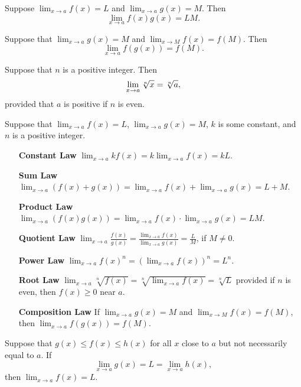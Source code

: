 \documentclass{ximera}
\begin{document}
\begin{theorem}
Suppose $\lim_{x\to a} f(x)=L$ and $\lim_{x\to a}g(x)=M$. Then
\[
\lim_{x\to a} f(x)g(x) = LM.
\]
\end{theorem}




\begin{theorem}
Suppose that $\lim_{x\to a}g(x)=M$ and $\lim_{x\to M}f(x) =
f(M)$. Then
\[
\lim_{x\to a} f(g(x)) = f(M).
\]
\end{theorem}




\begin{theorem}
Suppose that $n$ is a positive integer. Then
$$\lim_{x\to a}\root n\of{x} = \root n\of{a},$$ provided that $a$ is
positive if $n$ is even.
\end{theorem}




\begin{theorem}
Suppose that $\lim_{x\to a}f(x)=L$, $\lim_{x\to a}g(x)=M$, $k$
is some constant, and $n$ is a positive integer.
\begin{itemize}
\item[\textbf{Constant Law}] $\lim_{x\to a} kf(x) = k\lim_{x\to a}f(x)=kL$.
\item[\textbf{Sum Law}] $\lim_{x\to a} (f(x)+g(x)) = \lim_{x\to a}f(x)+\lim_{x\to a}g(x)=L+M$.
\item[\textbf{Product Law}] $\lim_{x\to a} (f(x)g(x)) = \lim_{x\to a}f(x)\cdot\lim_{x\to a}g(x)=LM$.
\item[\textbf{Quotient Law}] $\lim_{x\to a} \frac{f(x)}{g(x)} =
\frac{\lim_{x\to a}f(x)}{\lim_{x\to a}g(x)}=\frac{L}{M}$, if $M\ne0$.
\item[\textbf{Power Law}] $\lim_{x\to a} f(x)^n = \left(\lim_{x\to a}f(x)\right)^n=L^n$.
\item[\textbf{Root Law}] $\lim_{x\to a} \sqrt[n]{f(x)} = \sqrt[n]{\lim_{x\to
a}f(x)}=\sqrt[n]{L}$ provided if $n$ is even, then $f(x)\ge 0$
near $a$.
\item[\textbf{Composition Law}] If $\lim_{x\to a}g(x)=M$ and
$\lim_{x\to M}f(x) = f(M)$, then $\lim_{x\to a} f(g(x)) = f(M)$.
\end{itemize}
\end{theorem}




\begin{theorem}
Suppose that $g(x) \le f(x) \le h(x)$ for all $x$
close to $a$ but not necessarily equal to $a$. If
\[
\lim_{x\to a} g(x) = L = \lim_{x\to a} h(x),
\]
then $\lim_{x\to a} f(x) = L$.
\end{theorem}
\end{document}
